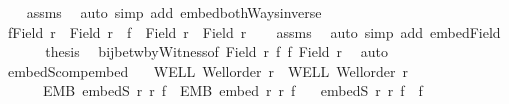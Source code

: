 \begin{isabellebody}
\ \ \isamarkupfalse%
\ assms\ \isamarkupfalse%
\ {\isacharparenleft}{\kern0pt}auto\ simp\ add{\isacharcolon}{\kern0pt}\ embed{\isacharunderscore}{\kern0pt}bothWays{\isacharunderscore}{\kern0pt}inverse{\isacharparenright}{\kern0pt}\isanewline
\ \ \isamarkupfalse%
\isanewline
\ \ \isamarkupfalse%
\ {\isachardoublequoteopen}f{\isacharbackquote}{\kern0pt}{\isacharparenleft}{\kern0pt}Field\ r{\isacharparenright}{\kern0pt}\ {\isasymle}\ Field\ r{\isacharprime}{\kern0pt}\ {\isasymand}\ f{\isacharprime}{\kern0pt}\ {\isacharbackquote}{\kern0pt}\ {\isacharparenleft}{\kern0pt}Field\ r{\isacharprime}{\kern0pt}{\isacharparenright}{\kern0pt}\ {\isasymle}\ Field\ r{\isachardoublequoteclose}\isanewline
\ \ \isamarkupfalse%
\ assms\ \isamarkupfalse%
\ {\isacharparenleft}{\kern0pt}auto\ simp\ add{\isacharcolon}{\kern0pt}\ embed{\isacharunderscore}{\kern0pt}Field{\isacharparenright}{\kern0pt}\isanewline
\ \ \isamarkupfalse%
\isanewline
\ \ \isamarkupfalse%
\ {\isacharquery}{\kern0pt}thesis\ \isamarkupfalse%
\ bij{\isacharunderscore}{\kern0pt}betw{\isacharunderscore}{\kern0pt}byWitness{\isacharbrackleft}{\kern0pt}of\ {\isachardoublequoteopen}Field\ r{\isachardoublequoteclose}\ f{\isacharprime}{\kern0pt}\ f\ {\isachardoublequoteopen}Field\ r{\isacharprime}{\kern0pt}{\isachardoublequoteclose}{\isacharbrackright}{\kern0pt}\ \isamarkupfalse%
\ auto\isanewline
{}\isamarkupfalse%
%
\endisatagproof
{\isafoldproof}%
%
\isadelimproof
\isanewline
%
\endisadelimproof
\isanewline
{}\isamarkupfalse%
\ embedS{\isacharunderscore}{\kern0pt}comp{\isacharunderscore}{\kern0pt}embed{\isacharcolon}{\kern0pt}\isanewline
\ \ \ WELL{\isacharcolon}{\kern0pt}\ {\isachardoublequoteopen}Well{\isacharunderscore}{\kern0pt}order\ r{\isachardoublequoteclose}\ \ WELL{\isacharprime}{\kern0pt}{\isacharcolon}{\kern0pt}\ {\isachardoublequoteopen}Well{\isacharunderscore}{\kern0pt}order\ r{\isacharprime}{\kern0pt}{\isachardoublequoteclose}\isanewline
\ \ \ \ \ \ EMB{\isacharcolon}{\kern0pt}\ {\isachardoublequoteopen}embedS\ r\ r{\isacharprime}{\kern0pt}\ f{\isachardoublequoteclose}\ \ EMB{\isacharprime}{\kern0pt}{\isacharcolon}{\kern0pt}\ {\isachardoublequoteopen}embed\ r{\isacharprime}{\kern0pt}\ r{\isacharprime}{\kern0pt}{\isacharprime}{\kern0pt}\ f{\isacharprime}{\kern0pt}{\isachardoublequoteclose}\isanewline
\ \ \ {\isachardoublequoteopen}embedS\ r\ r{\isacharprime}{\kern0pt}{\isacharprime}{\kern0pt}\ {\isacharparenleft}{\kern0pt}f{\isacharprime}{\kern0pt}\ {\isasymcirc}\ f{\isacharparenright}{\kern0pt}{\isachardoublequoteclose}\isanewline

\end{isabellebody}
